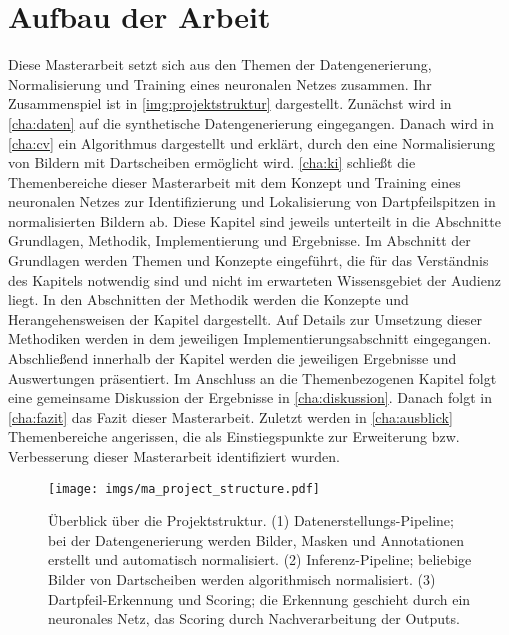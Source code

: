 

\section{Aufbau der Arbeit}
\label{sec:aufbau}

Diese Masterarbeit setzt sich aus den Themen der Datengenerierung, Normalisierung und Training eines neuronalen Netzes zusammen. Ihr Zusammenspiel ist in \autoref{img:projektstruktur} dargestellt. Zunächst wird in \autoref{cha:daten} auf die synthetische Datengenerierung eingegangen. Danach wird in \autoref{cha:cv} ein Algorithmus dargestellt und erklärt, durch den eine Normalisierung von Bildern mit Dartscheiben ermöglicht wird. \autoref{cha:ki} schließt die Themenbereiche dieser Masterarbeit mit dem Konzept und Training eines neuronalen Netzes zur Identifizierung und Lokalisierung von Dartpfeilspitzen in normalisierten Bildern ab. Diese Kapitel sind jeweils unterteilt in die Abschnitte Grundlagen, Methodik, Implementierung und Ergebnisse. Im Abschnitt der Grundlagen werden Themen und Konzepte eingeführt, die für das Verständnis des Kapitels notwendig sind und nicht im erwarteten Wissensgebiet der Audienz liegt. In den Abschnitten der Methodik werden die Konzepte und Herangehensweisen der Kapitel dargestellt. Auf Details zur Umsetzung dieser Methodiken werden in dem jeweiligen Implementierungsabschnitt eingegangen. Abschließend innerhalb der Kapitel werden die jeweiligen Ergebnisse und Auswertungen präsentiert. Im Anschluss an die Themenbezogenen Kapitel folgt eine gemeinsame Diskussion der Ergebnisse in \autoref{cha:diskussion}. Danach folgt in \autoref{cha:fazit} das Fazit dieser Masterarbeit. Zuletzt werden in \autoref{cha:ausblick} Themenbereiche angerissen, die als Einstiegspunkte zur Erweiterung bzw. Verbesserung dieser Masterarbeit identifiziert wurden.

\begin{figure}
    \centering
    \texttt{[image: imgs/ma\_project\_structure.pdf]}
    \caption{Überblick über die Projektstruktur. (1) Datenerstellungs-Pipeline; bei der Datengenerierung werden Bilder, Masken und Annotationen erstellt und automatisch normalisiert. (2) Inferenz-Pipeline; beliebige Bilder von Dartscheiben werden algorithmisch normalisiert. (3) Dartpfeil-Erkennung und Scoring; die Erkennung geschieht durch ein neuronales Netz, das Scoring durch Nachverarbeitung der Outputs.}
    \label{img:projektstruktur}
\end{figure}

